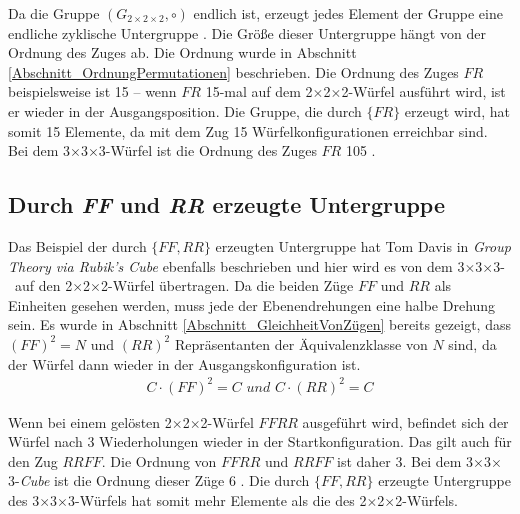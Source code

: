 \documentclass[12pt,a4paper, usenames, dvipsnames]{article}
\theoremstyle{mystyle}
\theoremstyle{definition}
\newcommand{\Gtwo}{\ensuremath{G_{2\times 2\times 2}}}
\newcommand{\Ttwo}{2$\times$2$\times$2-}
\newcommand{\Tthree}{3$\times$3$\times$3-}
\begin{document}
Da die Gruppe $(\Gtwo, \circ)$ endlich ist, erzeugt jedes Element der Gruppe eine endliche zyklische Untergruppe \cite{TD}. Die Größe dieser Untergruppe hängt von der Ordnung des Zuges ab. Die Ordnung wurde in Abschnitt \ref{Abschnitt_OrdnungPermutationen} beschrieben.
Die Ordnung des Zuges $FR$ beispielsweise ist 15 -- wenn $FR$ 15-mal auf dem \Ttwo Würfel ausführt wird, ist er wieder in der Ausgangsposition. 
Die Gruppe, die durch $\{FR\}$ erzeugt wird, hat somit 15 Elemente, da mit dem Zug 15 Würfelkonfigurationen erreichbar sind. Bei dem \Tthree Würfel ist die Ordnung des Zuges $FR$ 105 \cite{TD}.
%
%
%
%
%
%
%
%
%
%
%
%
%
%
%
%
%
%
%

\subsection{Durch \textit{FF} und \textit{RR} erzeugte Untergruppe}
\label{Abschnitt_UntergruppeFFRR}

Das Beispiel der durch $\{ FF, RR \}$ erzeugten Untergruppe hat Tom Davis in \textit{Group Theory via Rubik's Cube} \cite{TD} ebenfalls beschrieben und hier wird es von dem \Tthree \ auf den \Ttwo Würfel übertragen.
Da die beiden Züge $FF$ und $RR$ als Einheiten gesehen werden, muss jede der Ebenendrehungen eine halbe Drehung sein.
Es wurde in Abschnitt \ref{Abschnitt_GleichheitVonZügen} bereits gezeigt, dass $(FF)^2 = N$ und $(RR)^2$ Repräsentanten der Äquivalenzklasse von $N$ sind, da der Würfel dann wieder in der Ausgangskonfiguration ist.
\begin{align*}
C \cdot (FF)^2 = C \textit{ und } C \cdot (RR)^2 = C
\end{align*}

Wenn bei einem gelösten \Ttwo Würfel $FFRR$ ausgeführt wird, befindet sich der Würfel nach 3 Wiederholungen wieder in der Startkonfiguration. Das gilt auch für den Zug $RRFF$. Die Ordnung von $FFRR$ und $RRFF$ ist daher 3. Bei dem \Tthree \textit{Cube} ist die Ordnung dieser Züge 6 \cite{TD}.
Die durch $\{ FF, RR \}$ erzeugte Untergruppe des \Tthree Würfels hat somit mehr Elemente als die des \Ttwo Würfels. 
\end{document}
